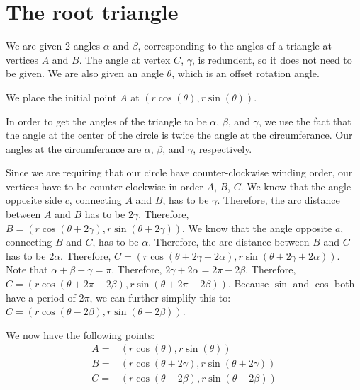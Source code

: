 \documentclass[a4paper,12pt]{article}
\theoremstyle{definition}
\theoremstyle{plain}
\begin{document}
	\newpage

	\section{The root triangle}
	We are given 2 angles $\alpha$ and $\beta$, corresponding to the angles of a triangle at vertices $A$ and $B$.
	The angle at vertex $C$, $\gamma$, is redundent, so it does not need to be given.
	We are also given an angle $\theta$, which is an offset rotation angle.

	We place the initial point $A$ at $\left(r\cos\left(\theta\right), r\sin\left(\theta\right)\right)$.

	In order to get the angles of the triangle to be $\alpha$, $\beta$, and $\gamma$, we use the fact that the angle
	at the center of the circle is twice the angle at the circumferance. Our angles at the circumferance are
	$\alpha$, $\beta$, and $\gamma$, respectively.

	Since we are requiring that our circle have counter-clockwise winding order, our vertices have to be counter-clockwise
	in order $A$, $B$, $C$. We know that the angle opposite side $c$, connecting $A$ and $B$, has to be $\gamma$.
	Therefore, the arc distance between $A$ and $B$ has to be $2\gamma$. Therefore,
	$B = \left(r\cos\left(\theta + 2\gamma\right), r\sin\left(\theta + 2\gamma\right)\right)$.
	We know that the angle opposite $a$, connecting $B$ and $C$, has to be $\alpha$.
	Therefore, the arc distance between $B$ and $C$ has to be $2\alpha$.
	Therefore,
	$C = \left(r\cos\left(\theta + 2\gamma + 2\alpha\right), r\sin\left(\theta + 2\gamma + 2\alpha\right)\right)$.
	Note that $\alpha + \beta + \gamma = \pi$.
	Therefore, $2\gamma + 2\alpha = 2\pi - 2\beta$. Therefore,
	$C = \left(r\cos\left(\theta + 2\pi - 2\beta\right), r\sin\left(\theta + 2\pi - 2\beta\right)\right)$. Because
	$\sin$ and $\cos$ both have a period of $2\pi$, we can further simplify this to:
	$C = \left(r\cos\left(\theta - 2\beta\right), r\sin\left(\theta - 2\beta\right)\right)$.

	We now have the following points:
	\begin{align*}
		A =& \left(r\cos\left(\theta\right), r\sin\left(\theta\right)\right) \\
		B =& \left(r\cos\left(\theta + 2\gamma\right), r\sin\left(\theta + 2\gamma\right)\right) \\
		C =& \left(r\cos\left(\theta - 2\beta\right), r\sin\left(\theta - 2\beta\right)\right)
	\end{align*}
\end{document}
